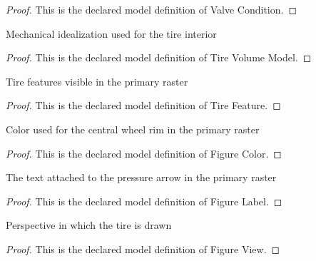 \begin{proof}
  This is the declared model definition of Valve Condition.
\end{proof}
\begin{definition}
  \label{def:physics:phyx-mini-0441:phyxminiproblems-problemphyxmini0441-tirevolumemodel}
  Mechanical idealization used for the tire interior
\end{definition}
\begin{proof}
  This is the declared model definition of Tire Volume Model.
\end{proof}
\begin{definition}
  \label{def:physics:phyx-mini-0441:phyxminiproblems-problemphyxmini0441-tirefeature}
  Tire features visible in the primary raster
\end{definition}
\begin{proof}
  This is the declared model definition of Tire Feature.
\end{proof}
\begin{definition}
  \label{def:physics:phyx-mini-0441:phyxminiproblems-problemphyxmini0441-figurecolor}
  Color used for the central wheel rim in the primary raster
\end{definition}
\begin{proof}
  This is the declared model definition of Figure Color.
\end{proof}
\begin{definition}
  \label{def:physics:phyx-mini-0441:phyxminiproblems-problemphyxmini0441-figurelabel}
  The text attached to the pressure arrow in the primary raster
\end{definition}
\begin{proof}
  This is the declared model definition of Figure Label.
\end{proof}
\begin{definition}
  \label{def:physics:phyx-mini-0441:phyxminiproblems-problemphyxmini0441-figureview}
  Perspective in which the tire is drawn
\end{definition}
\begin{proof}
  This is the declared model definition of Figure View.
\end{proof}
